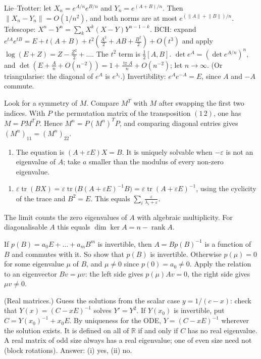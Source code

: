 \documentclass[11pt,a4paper]{article}
\begin{document}
Lie--Trotter: let \(X_n=e^{A/n}e^{B/n}\) and \(Y_n=e^{(A+B)/n}\). Then \(\lVert X_n-Y_n\rVert=O(1/n^2)\), and both norms are at most \(e^{(\lVert A\rVert+\lVert B\rVert)/n}\). Telescope: \(X^n-Y^n=\sum_k X^{k}(X-Y)Y^{n-1-k}\).
BCH: expand \(e^{tA}e^{tB}=E+t(A+B)+t^2(\frac{A^2}2+AB+\frac{B^2}2)+O(t^3)\) and apply \(\log(E+Z)=Z-\frac{Z^2}2+\dots\). The \(t^2\) term is \(\frac12[A,B]\).
\(\det e^A=(\det e^{A/n})^n\), and \(\det(E+\frac An+O(n^{-2}))=1+\frac{\operatorname{tr}A}n+O(n^{-2})\); let \(n\to\infty\). (Or triangularise: the diagonal of \(e^A\) is \(e^{\lambda_i}\).) Invertibility: \(e^Ae^{-A}=E\), since \(A\) and \(-A\) commute.

Look for a symmetry of \(M\). Compare \(M^T\) with \(M\) after swapping the first two indices.
With \(P\) the permutation matrix of the transposition \((1\,2)\), one has \(M=PM^TP\). Hence \(M^n=P(M^n)^TP\), and comparing diagonal entries gives \((M^n)_{11}=(M^n)_{22}\).

\begin{enumerate}
\def\labelenumi{(\alph{enumi})}
\tightlist
\item
  The equation is \((A+\varepsilon E)X=B\). It is uniquely solvable when \(-\varepsilon\) is not an eigenvalue of \(A\); take \(a\) smaller than the modulus of every non-zero eigenvalue.
\end{enumerate}
\begin{enumerate}
\def\labelenumi{(\alph{enumi})}
\setcounter{enumi}{1}
\tightlist
\item
  \(\varepsilon\operatorname{tr}(BX)=\varepsilon\operatorname{tr}\bigl(B(A+\varepsilon E)^{-1}B\bigr)=\varepsilon\operatorname{tr}(A+\varepsilon E)^{-1}\), using the cyclicity of the trace and \(B^2=E\). This equals \(\sum_i\frac{\varepsilon}{\lambda_i+\varepsilon}\).
\end{enumerate}
The limit counts the zero eigenvalues of \(A\) with algebraic multiplicity. For diagonalisable \(A\) this equals \(\dim\ker A=n-\operatorname{rank}A\).

If \(p(B)=a_0E+\dots+a_mB^m\) is invertible, then \(A=Bp(B)^{-1}\) is a function of \(B\) and commutes with it. So show that \(p(B)\) is invertible.
Otherwise \(p(\mu)=0\) for some eigenvalue \(\mu\) of \(B\), and \(\mu\ne0\) since \(p(0)=a_0\ne0\). Apply the relation to an eigenvector \(Bv=\mu v\): the left side gives \(p(\mu)Av=0\), the right side gives \(\mu v\ne0\).

(Real matrices.) Guess the solutions from the scalar case \(y=1/(c-x)\): check that \(Y(x)=(C-xE)^{-1}\) solves \(Y'=Y^2\).
If \(Y(x_0)\) is invertible, put \(C=Y(x_0)^{-1}+x_0E\). By uniqueness for the ODE, \(Y=(C-xE)^{-1}\) wherever the solution exists. It is defined on all of \(\mathbb R\) if and only if \(C\) has no real eigenvalue.
A real matrix of odd size always has a real eigenvalue; one of even size need not (block rotations). Answer: (i) yes, (ii) no.
\end{document}
